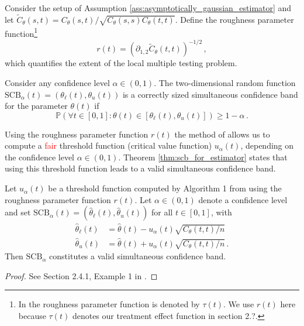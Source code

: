 \begin{definition}
    \label{def:roughness_parameter_function}
    Consider the setup of Assumption \ref{ass:asymptotically_gaussian_estimator} and let
    $\tilde{C}_\theta(s, t) = {C_\theta(s, t)}/{\sqrt{C_\theta(s, s) C_\theta(t, t)}}$.
    Define the roughness parameter function\footnote{In \cite{liebl2021} the roughness
    parameter function is denoted by $\tau(t)$. We use $r(t)$ here because $\tau(t)$
    denotes our treatment effect function in section 2.?.}
    \[
        r(t) = (\partial_{1,2}\tilde{C}_\theta(t, t))^{-1/2} \,,
    \]
    which quantifies the extent of the local multiple testing problem.
\end{definition}

\begin{definition}
    \label{ass:simultaneous_confidence_band}
    Consider any confidence level $\alpha \in (0, 1)$. The two-dimensional random
    function $\text{SCB}_\alpha(t) = (\theta_\ell(t), \theta_u(t))$ is a correctly sized
    simultaneous confidence band for the parameter $\theta(t)$ if
    \[
        \mathbb{P}(\forall t \in [0, 1]: \theta(t) \in [\theta_\ell(t), \theta_u(t)])
        \geq 1 - \alpha \,.
    \]
\end{definition}

Using the roughness parameter function $r(t)$ the method of \cite{liebl2021} allows us
to compute a \textcolor{red}{fair} threshold function (critical value function)
$u_\alpha(t)$, depending on the confidence level $\alpha \in (0, 1)$. Theorem
\ref{thm:scb_for_estimator} states that using this threshold function leads to a valid
simultaneous confidence band.

\begin{theorem}
    \label{thm:scb_for_estimator}
    Let $u_\alpha(t)$ be a threshold function computed by Algorithm 1 from
    \cite{liebl2021} using the roughness parameter function $r(t)$. Let $\alpha \in (0,
    1)$ denote a confidence level and set $\text{SCB}_\alpha(t) = (\hat{\theta}_\ell(t),
    \hat{\theta}_u(t))$ for all $t \in [0, 1]$, with
    \begin{align*}
        \hat{\theta}_\ell(t) &= \hat{\theta}(t) - u_\alpha(t) \sqrt{C_\theta(t, t) /
        n}\\
        \hat{\theta}_u(t) &= \hat{\theta}(t) + u_\alpha(t) \sqrt{C_\theta(t, t) / n} \,.
    \end{align*}
    Then $\text{SCB}_\alpha$ constitutes a valid simultaneous confidence band.
\end{theorem}
\begin{proof}
    See Section 2.4.1, Example 1 in \cite{liebl2021}.
\end{proof}


